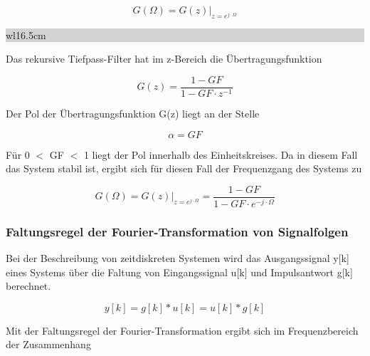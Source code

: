 \begin{equation}\label{eq:eighteight}
G\left(\Omega \right)=\left. G\left(z\right)\right|_{z=e^{j\cdot \Omega } }
\end{equation}

\clearpage

\noindent
\colorbox{lightgray}{%
%
\renewcommand\arraystretch{0.6}%
\begin{tabular}{ wl{16.5cm} }
{\selectfont{Beispiel: Rekursives Tiefpass-Filter}}
\end{tabular}%
}\medskip

\noindent Das rekursive Tiefpass-Filter hat im z-Bereich die \"{U}bertragungsfunktion

\begin{equation}\label{eq:eightnine}
G\left(z\right)=\frac{1-GF}{1-GF\cdot z^{-1}}
\end{equation}

\noindent Der Pol der \"{U}bertragungsfunktion G(z) liegt an der Stelle

\begin{equation}\label{eq:eightten}
\alpha =GF
\end{equation}

\noindent F\"{u}r 0 $\mathrm{<}$ GF $\mathrm{<}$ 1 liegt der Pol innerhalb des Einheitskreises. Da in diesem Fall das System stabil ist, ergibt sich f\"{u}r diesen Fall der Frequenzgang des Systems zu

\begin{equation}\label{eq:eighteleven}
G\left(\Omega \right)=\left. G\left(z\right)\right|_{z=e^{j\cdot \Omega } } =\frac{1-GF}{1-GF\cdot e^{-j\cdot \Omega}}
\end{equation}

\subsubsection{Faltungsregel der Fourier-Transformation von Signalfolgen}

\noindent Bei der Beschreibung von zeitdiskreten Systemen wird das Ausgangssignal y[k] eines Systems \"{u}ber die Faltung von Eingangssignal u[k] und Impulsantwort g[k] berechnet.

\begin{equation}\label{eq:eighttwelve}
y\left[k\right]=g\left[k\right]*u\left[k\right]=u\left[k\right]*g\left[k\right]
\end{equation}

\noindent Mit der Faltungsregel der Fourier-Transformation ergibt sich im Frequenzbereich der Zusammenhang

